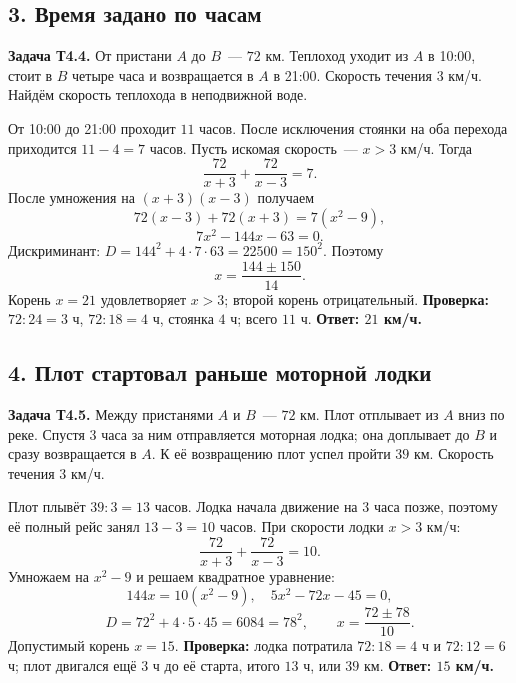 \documentclass[a4paper,12pt]{article}
\newcommand{\important}[1]{\textcolor{darkaccent}{\textbf{#1}}}
\begin{document}
\subsection{3. Время задано по часам}
\textbf{Задача Т4.4.} От пристани $A$ до $B$~--- $72$ км. Теплоход уходит из $A$ в 10:00, стоит в $B$ четыре часа и возвращается в $A$ в 21:00. Скорость течения $3$ км/ч. Найдём скорость теплохода в неподвижной воде.

От 10:00 до 21:00 проходит $11$ часов. После исключения стоянки на оба перехода приходится $11-4=7$ часов. Пусть искомая скорость~--- $x>3$ км/ч. Тогда
\[
\frac{72}{x+3}+\frac{72}{x-3}=7.
\]
После умножения на $(x+3)(x-3)$ получаем
\[
72(x-3)+72(x+3)=7(x^2-9),
\]
\[
7x^2-144x-63=0.
\]
Дискриминант: $D=144^2+4\cdot7\cdot63=22500=150^2$. Поэтому
\[
x=\frac{144\pm150}{14}.
\]
Корень $x=21$ удовлетворяет $x>3$; второй корень отрицательный.
\textbf{Проверка:} $72:24=3$ ч, $72:18=4$ ч, стоянка $4$ ч; всего $11$ ч. \important{Ответ: $21$ км/ч.}

\subsection{4. Плот стартовал раньше моторной лодки}
\textbf{Задача Т4.5.} Между пристанями $A$ и $B$~--- $72$ км. Плот отплывает из $A$ вниз по реке. Спустя $3$ часа за ним отправляется моторная лодка; она доплывает до $B$ и сразу возвращается в $A$. К её возвращению плот успел пройти $39$ км. Скорость течения $3$ км/ч.

Плот плывёт $39:3=13$ часов. Лодка начала движение на $3$ часа позже, поэтому её полный рейс занял $13-3=10$ часов. При скорости лодки $x>3$ км/ч:
\[
\frac{72}{x+3}+\frac{72}{x-3}=10.
\]
Умножаем на $x^2-9$ и решаем квадратное уравнение:
\[
144x=10(x^2-9),\quad 5x^2-72x-45=0,
\]
\[
D=72^2+4\cdot5\cdot45=6084=78^2,
\qquad x=\frac{72\pm78}{10}.
\]
Допустимый корень $x=15$. \textbf{Проверка:} лодка потратила $72:18=4$ ч и $72:12=6$ ч; плот двигался ещё $3$ ч до её старта, итого $13$ ч, или $39$ км.
\important{Ответ: $15$ км/ч.}

\clearpage
\end{document}
